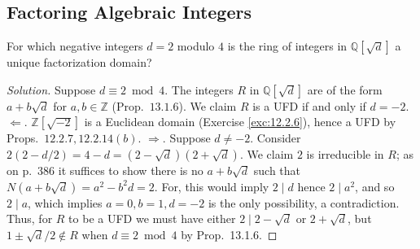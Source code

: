 \documentclass[12pt]{article}
\theoremstyle{remark}
\begin{document}
\subsection{Factoring Algebraic Integers}
\setcounter{subsubsection}{1}
\begin{problem}
  For which negative integers $d=2$ modulo $4$ is the ring of integers in $\mathbb{Q}[\sqrt{d}]$ a unique factorization domain?
\end{problem}
\begin{proof}[Solution]
  Suppose $d \equiv 2 \bmod 4$. The integers $R$ in $\mathbb{Q}[\sqrt{d}]$ are of the form $a + b\sqrt{d}$ for $a,b \in \mathbb{Z}$ (Prop.~$13.1.6$). We claim $R$ is a UFD if and only if $d = -2$. $\Leftarrow$. $\mathbb{Z}[\sqrt{-2}]$ is a Euclidean domain (Exercise \ref{exc:12.2.6}), hence a UFD by Props.~$12.2.7,12.2.14(b)$. $\Rightarrow$. Suppose $d \ne -2$. Consider $2(2-d/2) = 4 - d = (2-\sqrt{d})(2+\sqrt{d})$. We claim $2$ is irreducible in $R$; as on p.~386 it suffices to show there is no $a+b\sqrt{d}$ such that $N(a+b\sqrt{d}) = a^2 - b^2d = 2$. For, this would imply $2 \mid d$ hence $2 \mid a^2$, and so $2 \mid a$, which implies $a = 0,b=1,d=-2$ is the only possibility, a contradiction. Thus, for $R$ to be a UFD we must have either $2 \mid 2-\sqrt{d}$ or $2+\sqrt{d}$, but $1\pm\sqrt{d}/2 \notin R$ when $d \equiv 2 \bmod 4$ by Prop.~13.1.6.
\end{proof}
\end{document}
